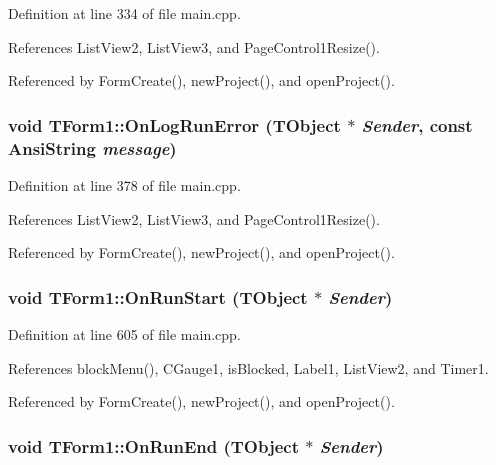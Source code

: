 Definition at line 334 of file main.cpp.

References ListView2, ListView3, and PageControl1Resize().

Referenced by FormCreate(), newProject(), and openProject().\hypertarget{classTForm1_ffda0a341f5610795fb4815bc8e138ec}{
\subsubsection[OnLogRunError]{\setlength{\rightskip}{0pt plus 5cm}void TForm1::OnLogRunError (TObject $\ast$ {\em Sender}, \/  const AnsiString {\em message})}}
\label{classTForm1_ffda0a341f5610795fb4815bc8e138ec}




Definition at line 378 of file main.cpp.

References ListView2, ListView3, and PageControl1Resize().

Referenced by FormCreate(), newProject(), and openProject().\hypertarget{classTForm1_7295024a0639ad522328b213cb06e821}{
\subsubsection[OnRunStart]{\setlength{\rightskip}{0pt plus 5cm}void TForm1::OnRunStart (TObject $\ast$ {\em Sender})}}
\label{classTForm1_7295024a0639ad522328b213cb06e821}




Definition at line 605 of file main.cpp.

References blockMenu(), CGauge1, isBlocked, Label1, ListView2, and Timer1.

Referenced by FormCreate(), newProject(), and openProject().\hypertarget{classTForm1_c404db6653ee5eca5c04ae0fb9e8e5fd}{
\subsubsection[OnRunEnd]{\setlength{\rightskip}{0pt plus 5cm}void TForm1::OnRunEnd (TObject $\ast$ {\em Sender})}}
\label{classTForm1_c404db6653ee5eca5c04ae0fb9e8e5fd}




